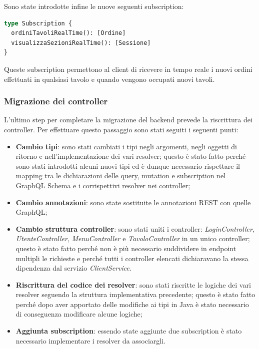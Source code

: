 Sono state introdotte infine le nuove seguenti subscription:
\begin{lstlisting}[language=GraphQL]
type Subscription {
  ordiniTavoliRealTime(): [Ordine]
  visualizzaSezioniRealTime(): [Sessione]
}
\end{lstlisting}
Queste subscription permettono al client di ricevere in tempo reale i nuovi ordini effettuati in qualsiasi tavolo e quando vengono occupati nuovi tavoli.
\subsubsection*{Migrazione dei controller}
L'ultimo step per completare la migrazione del backend prevede la riscrittura dei controller. Per effettuare questo passaggio sono stati seguiti i seguenti punti:
\begin{itemize}
  \item \textbf{Cambio tipi}: sono stati cambiati i tipi negli argomenti, negli oggetti di ritorno e nell'implementazione dei vari resolver; questo è stato fatto perché sono stati introdotti alcuni nuovi tipi ed è dunque necessario rispettare il mapping tra le dichiarazioni delle query, mutation e subscription nel GraphQL Schema e i corrispettivi resolver nei controller;
  \item \textbf{Cambio annotazioni}: sono state sostituite le annotazioni REST con quelle GraphQL;
  \item \textbf{Cambio struttura controller}: sono stati uniti i controller: \textit{LoginController}, \textit{UtenteController}, \textit{MenuController} e \textit{TavoloController} in un unico controller; questo è stato fatto perché non è più necessario suddividere in endpoint multipli le richieste e perché tutti i controller elencati dichiaravano la stessa dipendenza dal servizio \textit{ClientService}.
  \item \textbf{Riscrittura del codice dei resolver}: sono stati riscritte le logiche dei vari resolver seguendo la struttura implementativa precedente; questo è stato fatto perché dopo aver apportato delle modifiche ai tipi in Java è stato necessario di conseguenza modificare alcune logiche;
  \item \textbf{Aggiunta subscription}: essendo state aggiunte due subscription è stato necessario implementare i resolver da associargli.
\end{itemize}

